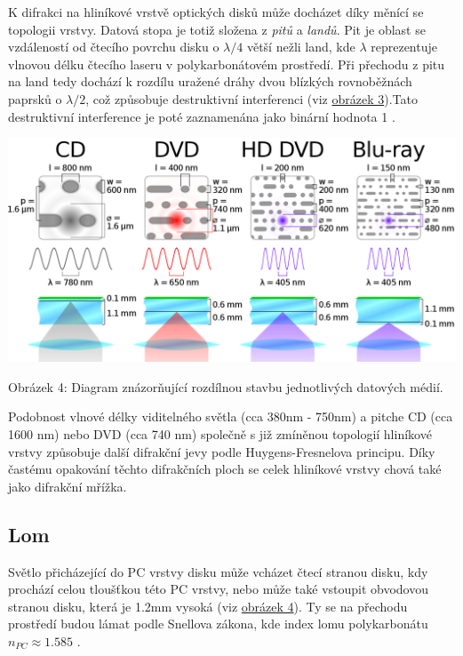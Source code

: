 \documentclass[titlepage]{article}
\begin{document}
K difrakci na hliníkové vrstvě optických disků může docházet díky měnící se topologii vrstvy. Datová stopa je totiž složena z \emph{pitů} a \emph{landů}.
Pit je oblast se vzdáleností od čtecího povrchu disku o $\lambda/4$ větší nežli land, kde $\lambda$ reprezentuje vlnovou délku čtecího laseru v polykarbonátovém prostředí.
Při přechodu z pitu na land tedy dochází k rozdílu uražené dráhy dvou blízkých rovnoběžnách paprsků o $\lambda/2$, což způsobuje destruktivní interferenci (viz \hyperref[image:3]{obrázek 3}).Tato destruktivní interference je poté zaznamenána jako binární hodnota 1 \cite{optical_disc}.

\pagebreak

 \label{image:4}
\includegraphics[width=\textwidth]{construction2.png}
\begin{center}
    Obrázek 4: Diagram znázorňující rozdílnou stavbu jednotlivých datových médií.\cite{img4}
\end{center}

Podobnost vlnové délky viditelného světla (cca 380nm - 750nm) a pitche CD (cca 1600 nm) nebo DVD (cca 740 nm) společně s již zmíněnou topologií hliníkové vrstvy způsobuje další difrakční jevy podle Huygens-Fresnelova principu.
Díky častému opakování těchto difrakčních ploch se celek hliníkové vrstvy chová také jako difrakční mřížka.

\subsection{Lom}
Světlo přicházející do PC vrstvy disku může vcházet čtecí stranou disku, kdy prochází celou tloušťkou této PC vrstvy, nebo může také vstoupit obvodovou stranou disku, která je 1.2mm vysoká (viz \hyperref[image:4]{obrázek 4}).
Ty se na přechodu prostředí budou lámat podle Snellova zákona, kde index lomu polykarbonátu $n_{PC} \approx 1.585$ \cite{index_lomu}.
\end{document}
